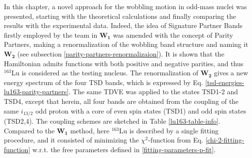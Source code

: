 In this chapter, a novel approach for the wobbling motion in odd-mass nuclei was presented, starting with the theoretical calculations and finally comparing the results with the experimental data. Indeed, the idea of Signature Partner Bands firstly employed by the team in $\mathbf{W_1}$ was amended with the concept of Parity Partners, making a renormalization of the wobbling band structure and naming it $\mathbf{W_2}$ (see subsection \ref{parity-partners-renormalizaion}). It is shown that the Hamiltonian admits functions with both positive and negative parities, and thus $^{163}$Lu is considered as the testing nucleus. The renormalization of $\mathbf{W_2}$ gives a new energy spectrum of the four TSD bands, which is expressed by Eq. \ref{tsd-energies-lu163-parity-partners}. The same TDVE was applied to the states TSD1-2 and TSD4, except that herein, all four bands are obtained from the coupling of the same $i_{13/2}$ odd proton with a core of even spin states (TSD1) and odd spin states (TSD2,4). The coupling schemes are sketched in Table \ref{lu163-table-info}. Compared to the $\mathbf{W_1}$ method, here $^{163}$Lu is described by a single fitting procedure, and it consisted of minimizing the $\chi^2$-function from Eq. \ref{chi-2-fitting-function} w.r.t. the free parameters defined in \ref{fitting-parameters-p-fit}. 

